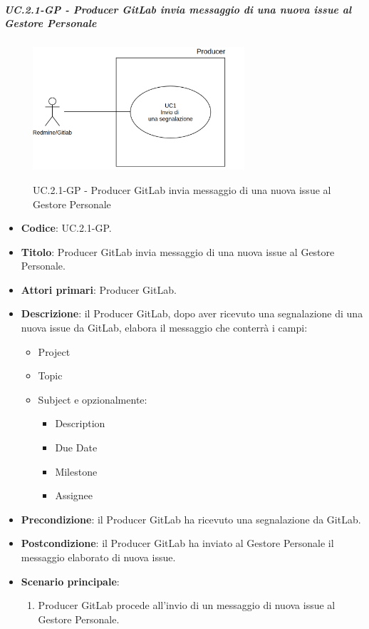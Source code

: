 		\subparagraph{UC\theuccount.2.1-GP - Producer GitLab invia messaggio di una nuova issue al Gestore Personale}
		\begin{figure}[H]
			\centering
			\includegraphics[width=0.7\textwidth]{img/UC1.png}\\
			\caption{UC\theuccount.2.1-GP - Producer GitLab invia messaggio di una nuova issue al Gestore Personale}
		\end{figure}
		\begin{itemize}
			\item \textbf{Codice}: UC\theuccount.2.1-GP.
			\item \textbf{Titolo}: Producer GitLab invia messaggio di una nuova issue al Gestore Personale.
			\item \textbf{Attori primari}: Producer GitLab.
			\item \textbf{Descrizione}: il Producer GitLab, dopo aver ricevuto una segnalazione di una nuova issue da GitLab, elabora il messaggio che conterrà i campi:
			\begin{itemize}
				\item Project
				\item Topic
				\item Subject e opzionalmente:
				\begin{itemize}
					\item Description
					\item Due Date
					\item Milestone
					\item Assignee
				\end{itemize}
			\end{itemize}
			\item \textbf{Precondizione}: il Producer GitLab ha ricevuto una segnalazione da GitLab.
			\item \textbf{Postcondizione}: il Producer GitLab ha inviato al Gestore Personale il messaggio elaborato di nuova issue.
			\item \textbf{Scenario principale}: 
			\begin{enumerate}
				\item Producer GitLab procede all'invio di un messaggio di
				nuova issue al Gestore Personale.
			\end{enumerate}
			
		\end{itemize}
	
